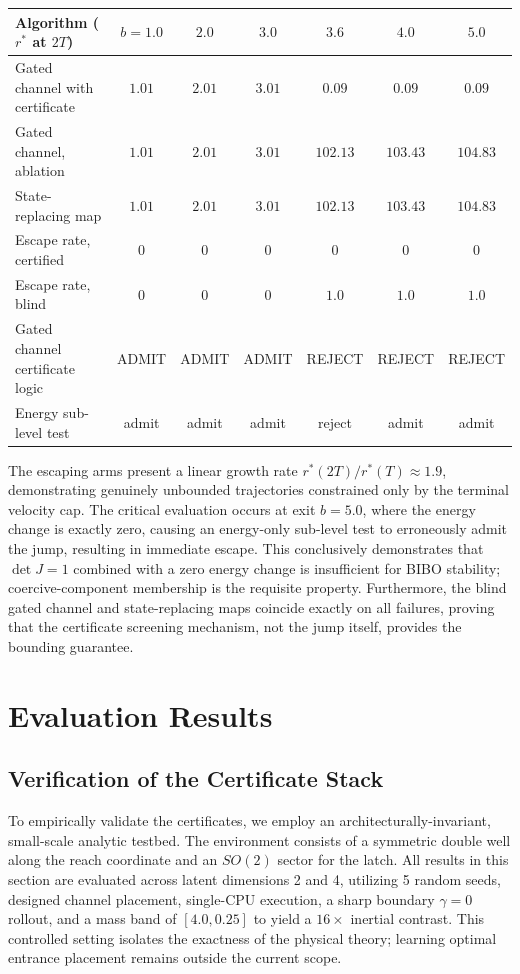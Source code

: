 \documentclass{article}
\newcommand{\detJ}{\det J}
\begin{document}
\begin{center}\small
\begin{tabular}{lcccccc}
\toprule
Algorithm ($r^\ast$ at $2T$) & $b{=}1.0$ & $2.0$ & $3.0$ & $3.6$ & $4.0$ & $5.0$ \\
\midrule
Gated channel with certificate & $1.01$ & $2.01$ & $3.01$ & $0.09$ & $0.09$ & $0.09$ \\
Gated channel, ablation & $1.01$ & $2.01$ & $3.01$ & $102.13$ & $103.43$ & $104.83$ \\
State-replacing map & $1.01$ & $2.01$ & $3.01$ & $102.13$ & $103.43$ & $104.83$ \\
\midrule
Escape rate, certified & $0$ & $0$ & $0$ & $0$ & $0$ & $0$ \\
Escape rate, blind & $0$ & $0$ & $0$ & $1.0$ & $1.0$ & $1.0$ \\
Gated channel certificate logic & ADMIT & ADMIT & ADMIT & REJECT & REJECT & REJECT \\
Energy sub-level test & admit & admit & admit & reject & admit & admit \\
\bottomrule
\end{tabular}
\end{center}

The escaping arms present a linear growth rate $r^\ast(2T)/r^\ast(T)\approx1.9$, demonstrating genuinely unbounded trajectories constrained only by the terminal velocity cap. The critical evaluation occurs at exit $b=5.0$, where the energy change is exactly zero, causing an energy-only sub-level test to erroneously admit the jump, resulting in immediate escape. This conclusively demonstrates that $\detJ=1$ combined with a zero energy change is insufficient for BIBO stability; coercive-component membership is the requisite property. Furthermore, the blind gated channel and state-replacing maps coincide exactly on all failures, proving that the certificate screening mechanism, not the jump itself, provides the bounding guarantee.

\section{Evaluation Results}
\label{app:res}

\subsection{Verification of the Certificate Stack}
\label{sec:certificates}
To empirically validate the certificates, we employ an architecturally-invariant, small-scale analytic testbed. The environment consists of a symmetric double well along the reach coordinate and an $SO(2)$ sector for the latch. All results in this section are evaluated across latent dimensions 2 and 4, utilizing 5 random seeds, designed channel placement, single-CPU execution, a sharp boundary $\gamma=0$ rollout, and a mass band of $[4.0,0.25]$ to yield a $16\times$ inertial contrast. This controlled setting isolates the exactness of the physical theory; learning optimal entrance placement remains outside the current scope.
\end{document}
